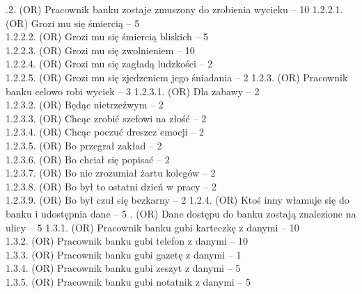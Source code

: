 \documentclass[10pt,a4paper,twoside]{article}
\newenvironment{subs}
{\adjustwidth{3em}{0pt}}
{\endadjustwidth}
\begin{document}
\begin{subs}
\begin{subs}
\begin{subs}
            \end{subs}
            1.2.2. (OR) Pracownik banku zostaje zmuszony do zrobienia wycieku -- 10
            \begin{subs}
                1.2.2.1. (OR) Grozi mu się śmiercią -- 5 \\
                1.2.2.2. (OR) Grozi mu się śmiercią bliskich -- 5 \\
                1.2.2.3. (OR) Grozi mu się zwolnieniem -- 10 \\
                1.2.2.4. (OR) Grozi mu się zagładą ludzkości -- 2 \\
                1.2.2.5. (OR) Grozi mu się zjedzeniem jego śniadania -- 2
            \end{subs}
            1.2.3. (OR) Pracownik banku celowo robi wyciek -- 3
            \begin{subs}
                1.2.3.1. (OR) Dla zabawy -- 2 \\
                1.2.3.2. (OR) Będąc nietrzeźwym -- 2 \\
                1.2.3.3. (OR) Chcąc zrobić szefowi na złość -- 2 \\
                1.2.3.4. (OR) Chcąc poczuć dreszcz emocji -- 2 \\
                1.2.3.5. (OR) Bo przegrał zakład -- 2 \\
                1.2.3.6. (OR) Bo chciał się popisać -- 2 \\
                1.2.3.7. (OR) Bo nie zrozumiał żartu kolegów -- 2 \\
                1.2.3.8. (OR) Bo był to ostatni dzień w pracy -- 2 \\
                1.2.3.9. (OR) Bo był czuł się bezkarny -- 2
            \end{subs}
            1.2.4. (OR) Ktoś inny włamuje się do banku i udostępnia dane -- 5
        \end{subs}
        1.3. (OR) Dane dostępu do banku zostają znalezione na ulicy -- 5
        \begin{subs}
            1.3.1. (OR) Pracownik banku gubi karteczkę z danymi -- 10 \\
            1.3.2. (OR) Pracownik banku gubi telefon z danymi -- 10 \\
            1.3.3. (OR) Pracownik banku gubi gazetę z danymi -- 1 \\
            1.3.4. (OR) Pracownik banku gubi zeszyt z danymi -- 5 \\
            1.3.5. (OR) Pracownik banku gubi notatnik z danymi -- 5 \\

\end{subs}
\end{subs}
\end{document}
